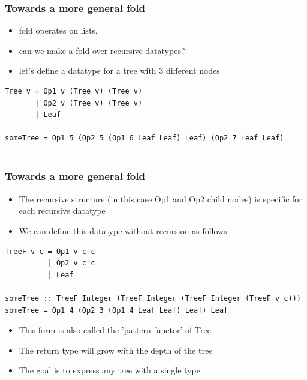 \documentclass[10pt]{beamer}
\begin{document}
\begin{frame}[fragile]
\frametitle{Towards a more general fold}
\begin{itemize}
\item fold operates on lists.  
\item can we make a fold over recursive datatypes?
\item let's define a datatype for a tree with 3 different nodes
\end{itemize}

\begin{lstlisting}
Tree v = Op1 v (Tree v) (Tree v) 
       | Op2 v (Tree v) (Tree v) 
       | Leaf

someTree = Op1 5 (Op2 5 (Op1 6 Leaf Leaf) Leaf) (Op2 7 Leaf Leaf)
       
\end{lstlisting}

\end{frame}

\begin{frame}[fragile]
\frametitle{Towards a more general fold}
\begin{itemize}
\item The recursive structure (in this case Op1 and Op2 child nodes) is specific for each recursive datatype
\item We can define this datatype without recursion as follows
\end{itemize}

\begin{lstlisting}
TreeF v c = Op1 v c c
          | Op2 v c c 
          | Leaf 

someTree :: TreeF Integer (TreeF Integer (TreeF Integer (TreeF v c)))	  
someTree = Op1 4 (Op2 3 (Op1 4 Leaf Leaf) Leaf) Leaf	  
\end{lstlisting}


\begin{itemize}
\item This form is also called the 'pattern functor' of Tree		
\item The return type will grow with the depth of the tree 
\item The goal is to express any tree with a single type	
\end{itemize}

\end{frame}
\end{document}
